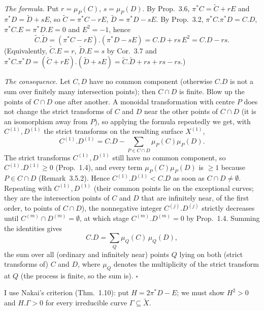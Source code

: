 \documentclass[11pt]{article}
\begin{document}
\pf
\emph{The formula.} Put $r=\mu_P(C)$, $s=\mu_P(D)$. By Prop.~3.6, $\pi^*C=\widetilde C+rE$ and $\pi^*D=\widetilde D+sE$, so $\widetilde C=\pi^*C-rE$, $\widetilde D=\pi^*D-sE$. By Prop.~3.2, $\pi^*C.\pi^*D=C.D$, $\pi^*C.E=\pi^*D.E=0$ and $E^2=-1$, hence
\[
\widetilde C.\widetilde D=(\pi^*C-rE).(\pi^*D-sE)=C.D+rs\,E^2=C.D-rs .
\]
(Equivalently, $\widetilde C.E=r$, $\widetilde D.E=s$ by Cor.~3.7 and $\pi^*C.\pi^*D=(\widetilde C+rE).(\widetilde D+sE)=\widetilde C.\widetilde D+rs+rs-rs$.)

\emph{The consequence.} Let $C,D$ have no common component (otherwise $C.D$ is not a sum over finitely many intersection points); then $C\cap D$ is finite. Blow up the points of $C\cap D$ one after another. A monoidal transformation with centre $P$ does not change the strict transforms of $C$ and $D$ near the other points of $C\cap D$ (it is an isomorphism away from $P$), so applying the formula repeatedly we get, with $C^{(1)},D^{(1)}$ the strict transforms on the resulting surface $X^{(1)}$,
\[
C^{(1)}.D^{(1)}=C.D-\sum_{P\in C\cap D}\mu_P(C)\mu_P(D).
\]
The strict transforms $C^{(1)},D^{(1)}$ still have no common component, so $C^{(1)}.D^{(1)}\ge0$ (Prop.~1.4), and every term $\mu_P(C)\mu_P(D)$ is $\ge1$ because $P\in C\cap D$ (Remark~3.5.2). Hence $C^{(1)}.D^{(1)}<C.D$ as soon as $C\cap D\ne\emptyset$. Repeating with $C^{(1)},D^{(1)}$ (their common points lie on the exceptional curves; they are the intersection points of $C$ and $D$ that are infinitely near, of the first order, to points of $C\cap D$), the nonnegative integer $C^{(j)}.D^{(j)}$ strictly decreases until $C^{(m)}\cap D^{(m)}=\emptyset$, at which stage $C^{(m)}.D^{(m)}=0$ by Prop.~1.4. Summing the identities gives
\[
C.D=\sum_{Q}\mu_Q(C)\,\mu_Q(D),
\]
the sum over all (ordinary and infinitely near) points $Q$ lying on both (strict transforms of) $C$ and $D$, where $\mu_Q$ denotes the multiplicity of the strict transform at $Q$ (the process is finite, so the sum is). \hfill$\square$

\pf
I use Nakai's criterion (Thm.~1.10): put $H=2\pi^*D-E$; we must show $H^2>0$ and $H.\Gamma>0$ for every irreducible curve $\Gamma\subseteq\widetilde X$.
\end{document}
